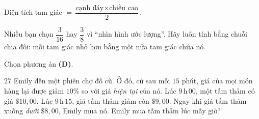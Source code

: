 {\begin{recallbox}Diện tích tam giác $=\dfrac{\text{cạnh đáy}\times\text{chiều cao}}{2}$.\end{recallbox}

\begin{warnbox}Nhiều bạn chọn $\dfrac{3}{16}$ hay $\dfrac38$ vì ``nhìn hình ước lượng''. Hãy luôn tính bằng chuỗi chia đôi: mỗi tam giác nhỏ hơn bằng một nửa tam giác chứa nó.\end{warnbox}

Chọn phương án \textbf{(D)}.
}

\begin{probbox}{27}{\relax}
Emily đến một phiên chợ đồ cũ. Ở đó, cứ sau mỗi $15$ phút, giá của mọi món hàng lại được giảm $10\%$ so với giá \emph{hiện tại} của nó. Lúc $9\,$h$\,00$, một tấm thảm có giá $\$10{,}00$. Lúc $9\,$h$\,15$, giá tấm thảm giảm còn $\$9{,}00$. Ngay khi giá tấm thảm xuống \emph{dưới} $\$8{,}00$, Emily mua nó. Emily mua tấm thảm lúc mấy giờ?
\end{probbox}

